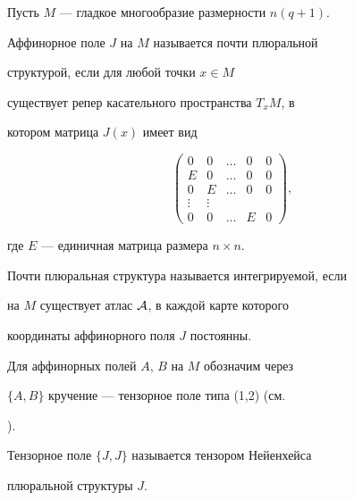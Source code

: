 Пусть $M$ --- гладкое многообразие  размерности $ n(q+1)$.





\begin{defn}


Аффинорное поле $J$ на $M$ называется почти плюральной


структурой, если для любой точки $x \in M$


существует репер касательного пространства $T_{x} M$, в


котором матрица $J(x)$ имеет вид


%


$$


\begin{pmatrix}


0 & 0 & \dots & 0 & 0 \\


E & 0 & \dots & 0 & 0 \\


0 & E & \dots & 0 & 0 \\


\vdots & \vdots & & &\\


0 & 0 & \dotsc & E & 0


\end{pmatrix}


,


$$


%


где $E$ --- единичная матрица размера $n \times n$.





Почти плюральная структура называется интегрируемой, если


на $M$ существует атлас $\cal A$, в каждой карте которого


координаты аффинорного поля $J$ постоянны.


\end{defn}





Для аффинорных полей $A$, $B$ на $M$ обозначим через


$\{A,B\}$ кручение --- тензорное поле типа (1,2) (см.


\cite{KN}).


Тензорное поле $\{ J,J\}$ называется тензором Нейенхейса


плюральной структуры $J$.





